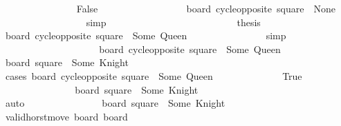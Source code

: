 \begin{isabellebody}
\ \ \ \ \ \ \ \ \ \ \ \ \ \ \isamarkupfalse%
\ False\isanewline
\ \ \ \ \ \ \ \ \ \ \ \ \ \ \ \ \isamarkupfalse%
\ {\isacartoucheopen}board{\isacharprime}\ {\isacharparenleft}cycle{\isacharunderscore}opposite\ square{\isacharprime}{\isacharparenright}\ {\isacharequal}\ None{\isacartoucheclose}\isanewline
\ \ \ \ \ \ \ \ \ \ \ \ \ \ \ \ \isamarkupfalse%
\ simp\isanewline
\ \ \ \ \ \ \ \ \ \ \ \ \isamarkupfalse%
\isanewline
\ \ \ \ \ \ \ \ \ \ \ \ \isamarkupfalse%
\ {\isacharquery}thesis\isanewline
\ \ \ \ \ \ \ \ \ \ \ \ \ \ \isamarkupfalse%
\ {\isacharbackquoteopen}board{\isacharprime}{\isacharprime}\ {\isacharparenleft}cycle{\isacharunderscore}opposite\ square{\isacharprime}{\isacharparenright}\ {\isacharequal}\ Some\ Queen{\isacharbackquoteclose}\isanewline
\ \ \ \ \ \ \ \ \ \ \ \ \ \ \isamarkupfalse%
\ simp\isanewline
\ \ \ \ \ \ \ \ \ \ \isamarkupfalse%
\isanewline
\ \ \ \ \ \ \ \ \isamarkupfalse%
\isanewline
\ \ \ \ \ \ \ \ \ \ \isamarkupfalse%
\ {\isachardoublequoteopen}board{\isacharprime}{\isacharprime}\ {\isacharparenleft}cycle{\isacharunderscore}opposite\ square{\isacharparenright}\ {\isacharequal}\ Some\ Queen{\isachardoublequoteclose}\isanewline
\ \ \ \ \ \ \ \ \ \ \isamarkupfalse%
\ {\isachardoublequoteopen}board{\isacharprime}{\isacharprime}\ square\ {\isacharequal}\ Some\ Knight{\isachardoublequoteclose}\isanewline
\ \ \ \ \ \ \ \ \ \ \isamarkupfalse%
\ {\isacharparenleft}cases\ {\isachardoublequoteopen}board\ {\isacharparenleft}cycle{\isacharunderscore}opposite\ square{\isacharparenright}\ {\isacharequal}\ Some\ Queen{\isachardoublequoteclose}{\isacharparenright}\isanewline
\ \ \ \ \ \ \ \ \ \ \ \ \isamarkupfalse%
\ True\isanewline
\ \ \ \ \ \ \ \ \ \ \ \ \isamarkupfalse%
\ \isamarkupfalse%
\ {\isachardoublequoteopen}board\ square\ {\isacharequal}\ Some\ Knight{\isachardoublequoteclose}\isanewline
\ \ \ \ \ \ \ \ \ \ \ \ \ \ \isamarkupfalse%
\ {}\isanewline
\ \ \ \ \ \ \ \ \ \ \ \ \ \ \isamarkupfalse%
\ auto\isanewline
\ \ \ \ \ \ \ \ \ \ \ \ \isamarkupfalse%
\ \isamarkupfalse%
\ {\isachardoublequoteopen}board{\isacharprime}\ square\ {\isacharequal}\ Some\ Knight{\isachardoublequoteclose}\isanewline
\ \ \ \ \ \ \ \ \ \ \ \ \ \ \isamarkupfalse%
\ {\isacharbackquoteopen}valid{\isacharunderscore}horst{\isacharunderscore}move\ board\ board{\isacharprime}{\isacharbackquoteclose}\isanewline

\end{isabellebody}
